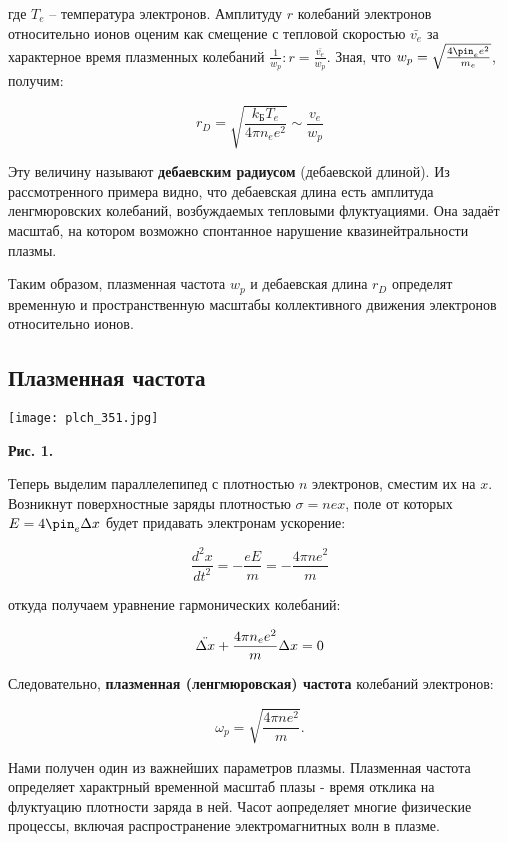 \documentclass [a4paper, 12pt]{article}
\begin{document}
    где $T_e$ -- температура электронов. Амплитуду $r$ колебаний электронов относительно ионов оценим как смещение с тепловой скоростью $\bar{v_e}$ за характерное время плазменных колебаний $\frac{1}{w_p}: r = \frac{\bar{v_e}}{w_p}$. Зная, что $w_p = \sqrt{\frac{4\pin_e e^2}{m_e}}$, получим:
    
\[r_D = \sqrt{\frac{k_{Б}T_e}{4\pi n_e e^2}} \sim \frac{v_e}{w_p}\]

    Эту величину называют \textbf{дебаевским радиусом} (дебаевской длиной). Из рассмотренного примера видно, что дебаевская длина есть амплитуда ленгмюровских колебаний, возбуждаемых тепловыми флуктуациями. Она задаёт масштаб, на котором возможно спонтанное нарушение квазинейтральности плазмы.

    Таким образом, плазменная частота $w_p$ и дебаевская длина $r_D$ определят временную и пространственную масштабы коллективного движения электронов относительно ионов.


\subsection*{Плазменная частота}

\begin{center}
\texttt{[image: plch\_351.jpg]}
\end{center}
\begin{flushright}
{\small \textbf{Рис. 1.} }
\end{flushright}

    Теперь выделим параллелепипед с плотностью $n$ электронов, сместим их на $x$. Возникнут поверхностные заряды плотностью $\sigma = nex$, поле от которых $E = 4\pin_e \Delta x$ будет придавать электронам ускорение:
    
\[
\dfrac{d^2x}{dt^2}=-\dfrac{eE}{m}=-\dfrac{4\pi n e^2}{m}
\]

    откуда получаем уравнение гармонических колебаний:
    
\[\Ddot{\Delta x} + \frac{4 \pi n_e e^2}{m} \Delta x = 0 \]


    Следовательно, \textbf{плазменная (ленгмюровская) частота} колебаний электронов:
    
\begin{equation}
\omega_p = \sqrt{\dfrac{4\pi ne^2}{m}}.
\end{equation}

    Нами получен один из важнейших параметров плазмы. Плазменная частота определяет характрный временной масштаб плазы - время отклика на флуктуацию плотности заряда в ней. Часот аопределяет многие физические процессы, включая распространение электромагнитных волн в плазме.
\end{document}
